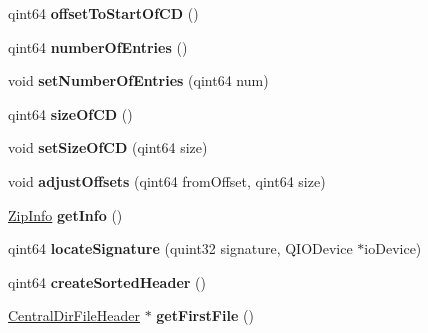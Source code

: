 \begin{DoxyCompactItemize}
\item 
qint64 {\bfseries offset\+To\+Start\+Of\+CD} ()\hypertarget{class_zip_central_dir_ad5a7357b59b1b2d407e0b6d94487bf87}{}\label{class_zip_central_dir_ad5a7357b59b1b2d407e0b6d94487bf87}

\item 
qint64 {\bfseries number\+Of\+Entries} ()\hypertarget{class_zip_central_dir_a5197e4c5b3773590c545aa8ce680262a}{}\label{class_zip_central_dir_a5197e4c5b3773590c545aa8ce680262a}

\item 
void {\bfseries set\+Number\+Of\+Entries} (qint64 num)\hypertarget{class_zip_central_dir_a95e84fe272a63c27179490f1d0756e64}{}\label{class_zip_central_dir_a95e84fe272a63c27179490f1d0756e64}

\item 
qint64 {\bfseries size\+Of\+CD} ()\hypertarget{class_zip_central_dir_a9cf10ec756a92328125ed75a158c28a1}{}\label{class_zip_central_dir_a9cf10ec756a92328125ed75a158c28a1}

\item 
void {\bfseries set\+Size\+Of\+CD} (qint64 size)\hypertarget{class_zip_central_dir_a167da4c36be3f138d3507118c0d2e804}{}\label{class_zip_central_dir_a167da4c36be3f138d3507118c0d2e804}

\item 
void {\bfseries adjust\+Offsets} (qint64 from\+Offset, qint64 size)\hypertarget{class_zip_central_dir_a9e390a8fa0359913f46ab5b607a19f9c}{}\label{class_zip_central_dir_a9e390a8fa0359913f46ab5b607a19f9c}

\item 
\hyperlink{class_zip_info}{Zip\+Info} {\bfseries get\+Info} ()\hypertarget{class_zip_central_dir_a592b4f4bc65a11805fad0bf669a87451}{}\label{class_zip_central_dir_a592b4f4bc65a11805fad0bf669a87451}

\item 
qint64 {\bfseries locate\+Signature} (quint32 signature, Q\+I\+O\+Device $\ast$io\+Device)\hypertarget{class_zip_central_dir_a14a2efad7b288924e81bdb726ddd7c53}{}\label{class_zip_central_dir_a14a2efad7b288924e81bdb726ddd7c53}

\item 
qint64 {\bfseries create\+Sorted\+Header} ()\hypertarget{class_zip_central_dir_a40ee6d012bab89f080e00fedae78dfd3}{}\label{class_zip_central_dir_a40ee6d012bab89f080e00fedae78dfd3}

\item 
\hyperlink{class_central_dir_file_header}{Central\+Dir\+File\+Header} $\ast$ {\bfseries get\+First\+File} ()\hypertarget{class_zip_central_dir_a4041e55f7ffdd57deef6e38fce7ce5ba}{}\label{class_zip_central_dir_a4041e55f7ffdd57deef6e38fce7ce5ba}


\end{DoxyCompactItemize}
